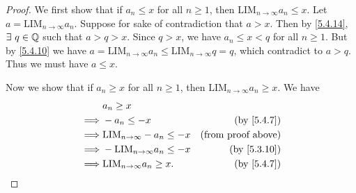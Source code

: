 \begin{proof}
  We first show that if \(a_n \leq x\) for all \(n \geq 1\), then \(\text{LIM}_{n \to \infty} a_n \leq x\).
  Let \(a = \text{LIM}_{n \to \infty} a_n\).
  Suppose for sake of contradiction that \(a > x\).
  Then by \cref{5.4.14}, \(\exists\ q \in \mathbb{Q}\) such that \(a > q > x\).
  Since \(q > x\), we have \(a_n \leq x < q\) for all \(n \geq 1\).
  But by \cref{5.4.10} we have \(a = \text{LIM}_{n \to \infty} a_n \leq \text{LIM}_{n \to \infty} q = q\), which contradict to \(a > q\).
  Thus we must have \(a \leq x\).

  Now we show that if \(a_n \geq x\) for all \(n \geq 1\), then \(\text{LIM}_{n \to \infty} a_n \geq x\).
  We have
  \begin{align*}
             & a_n \geq x                                                         \\
    \implies & -a_n \leq -x                           & \text{(by \cref{5.4.7})}  \\
    \implies & \text{LIM}_{n \to \infty} -a_n \leq -x & \text{(from proof above)} \\
    \implies & -\text{LIM}_{n \to \infty} a_n \leq -x & \text{(by \cref{5.3.10})} \\
    \implies & \text{LIM}_{n \to \infty} a_n \geq x.  & \text{(by \cref{5.4.7})}
  \end{align*}
\end{proof}